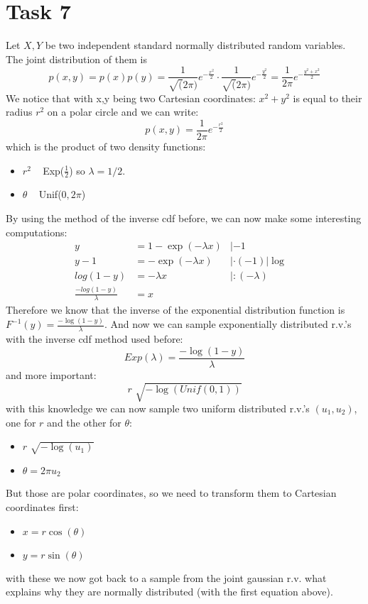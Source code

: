\documentclass{article}
\begin{document}
\section*{Task 7}
Let $X, Y$ be two independent standard normally distributed random variables. The joint distribution of them is
\[p(x,y) = p(x)p(y) = \frac{1}{\sqrt(2\pi)} e^{-\frac{x^2}{2}} \cdot \frac{1}{\sqrt(2\pi)} e^{-\frac{y^2}{2}} =  \frac{1}{2\pi} e^{-\frac{y^2 + x^2}{2}}\]
We notice that with x,y being two Cartesian coordinates: $x^2 + y^2$ is equal to their radius $r^2$ on a polar circle and we can write:
\[ p(x,y) = \frac{1}{2\pi} e^{-\frac{r^2}{2}}\]
which is the product of two density functions:
\begin{itemize}
	\item $r^2$ ~ Exp($\frac{1}{2}$) so $\lambda = 1/2$.
	\item $\theta$ ~ Unif($0,2\pi$)
\end{itemize}
By using the method of the inverse cdf before, we can now make some interesting computations:
\begin{align*}
y &= 1-\exp(-\lambda x) &|-1&\\
y-1 &= -\exp(-\lambda x) &|\cdot(-1) |\log&\\
log(1-y) &= -\lambda x &|: (-\lambda) &\\
\frac{-log(1-y)}{\lambda} &= x &&
\end{align*}
Therefore we know that the inverse of the exponential distribution function is $F^{-1}(y) = \frac{-\log(1-y)}{\lambda}$. And now we can sample exponentially distributed r.v.'s with the inverse cdf method used before:
\[Exp(\lambda) = \frac{-\log(1-y)}{\lambda} \]
and more important:
\[r\text{~}\sqrt{-\log(Unif(0,1))}\]
with this knowledge we can now sample two uniform distributed r.v.'s $(u_1, u_2)$, one for  $r$ and the other for $\theta$:
\begin{itemize}
	\item $r\text{~}\sqrt{-\log(u_1)}$
	\item $\theta = 2\pi u_2$
\end{itemize}
But those are polar coordinates, so we need to transform them to Cartesian coordinates first:
\begin{itemize}
	\item $x = r \cos (\theta)$
	\item $y = r \sin (\theta)$
\end{itemize}
with these we now got back to a sample from the joint gaussian r.v. what explains why they are normally distributed (with the first equation above).
\end{document}
